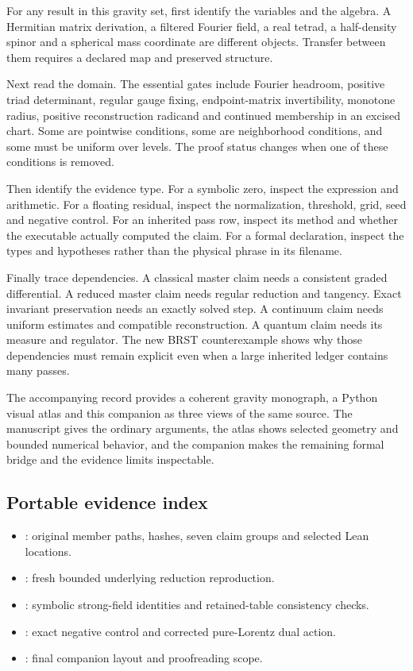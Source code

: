 For any result in this gravity set, first identify the variables and the algebra. A Hermitian matrix derivation, a filtered Fourier field, a real tetrad, a half-density spinor and a spherical mass coordinate are different objects. Transfer between them requires a declared map and preserved structure.

Next read the domain. The essential gates include Fourier headroom, positive triad determinant, regular gauge fixing, endpoint-matrix invertibility, monotone radius, positive reconstruction radicand and continued membership in an excised chart. Some are pointwise conditions, some are neighborhood conditions, and some must be uniform over levels. The proof status changes when one of these conditions is removed.

Then identify the evidence type. For a symbolic zero, inspect the expression and arithmetic. For a floating residual, inspect the normalization, threshold, grid, seed and negative control. For an inherited pass row, inspect its method and whether the executable actually computed the claim. For a formal declaration, inspect the types and hypotheses rather than the physical phrase in its filename.

Finally trace dependencies. A classical master claim needs a consistent graded differential. A reduced master claim needs regular reduction and tangency. Exact invariant preservation needs an exactly solved step. A continuum claim needs uniform estimates and compatible reconstruction. A quantum claim needs its measure and regulator. The new BRST counterexample shows why those dependencies must remain explicit even when a large inherited ledger contains many passes.

The accompanying record provides a coherent gravity monograph, a Python visual atlas and this companion as three views of the same source. The manuscript gives the ordinary arguments, the atlas shows selected geometry and bounded numerical behavior, and the companion makes the remaining formal bridge and the evidence limits inspectable.

\subsection{Portable evidence index}

\begin{itemize}
\item {}: original member paths, hashes, seven claim groups and selected Lean locations.
\item {}: fresh bounded underlying reduction reproduction.
\item {}: symbolic strong-field identities and retained-table consistency checks.
\item {}: exact negative control and corrected pure-Lorentz dual action.
\item {}: final companion layout and proofreading scope.
\end{itemize}
